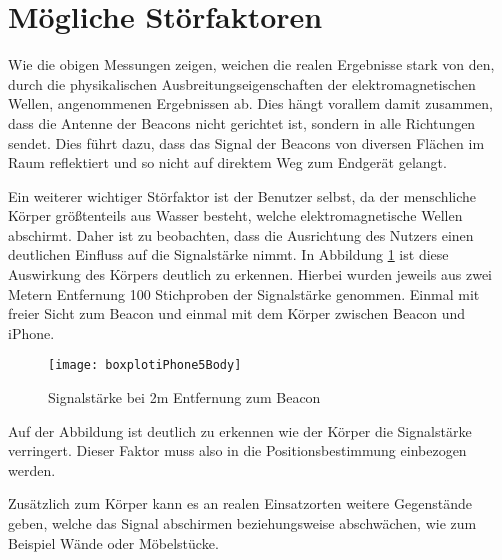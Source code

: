 \section{Mögliche Störfaktoren}
\label{sec:dataandmeasurement:interferencefactor}
Wie die obigen Messungen zeigen, weichen die realen Ergebnisse stark von den, durch die physikalischen Ausbreitungseigenschaften der elektromagnetischen Wellen, angenommenen Ergebnissen ab. Dies hängt vorallem damit zusammen, dass die Antenne der Beacons nicht gerichtet ist, sondern in alle Richtungen sendet. Dies führt dazu, dass das Signal der Beacons von diversen Flächen im Raum reflektiert und so nicht auf direktem Weg zum Endgerät gelangt. 

Ein weiterer wichtiger Störfaktor ist der Benutzer selbst, da der menschliche Körper größtenteils aus Wasser besteht, welche elektromagnetische Wellen abschirmt. Daher ist zu beobachten, dass die Ausrichtung des Nutzers einen deutlichen Einfluss auf die Signalstärke nimmt. In Abbildung \ref{boxplotiPhone5Body} ist diese Auswirkung des Körpers deutlich zu erkennen. Hierbei wurden jeweils aus zwei Metern Entfernung 100 Stichproben der Signalstärke genommen. Einmal mit freier Sicht zum Beacon und einmal mit dem Körper zwischen Beacon und iPhone. 

\begin{figure}[htb!]
		\centering
	\texttt{[image: boxplotiPhone5Body]}
	\caption{Signalstärke bei 2m Entfernung zum Beacon}
	\label{boxplotiPhone5Body}
\end{figure}

Auf der Abbildung ist deutlich zu erkennen wie der Körper die Signalstärke verringert. Dieser Faktor muss also in die Positionsbestimmung einbezogen werden.

Zusätzlich zum Körper kann es an realen Einsatzorten weitere Gegenstände geben, welche das Signal abschirmen beziehungsweise abschwächen, wie zum Beispiel Wände oder Möbelstücke.